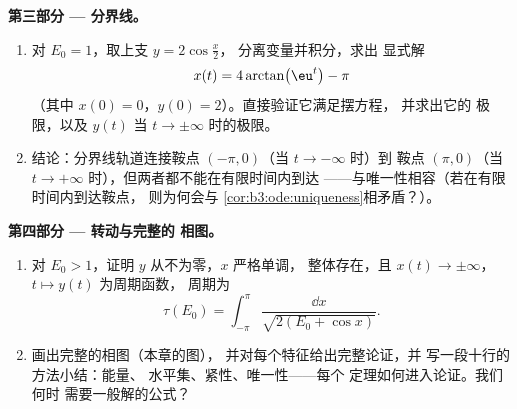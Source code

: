 \begin{problem}
\medskip
\noindent\textbf{第三部分 --- 分界线。}
\begin{enumerate}[resume]
  \item 对 $E_0 = 1$，取上支 $y = 2\cos\frac x2$，
        分离变量并积分，求出
        显式解
        \[
        x(t) = 4\arctan\bigl(\eu^{t}\bigr) - \pi
        \]
        （其中 $x(0) = 0$，$y(0) = 2$）。直接验证它满足摆方程，
        并求出它的
        极限，以及 $y(t)$ 当 $t \to
        \pm\infty$ 时的极限。
  \item 结论：分界线轨道连接鞍点
        $(-\pi, 0)$（当 $t \to -\infty$ 时）到
        鞍点 $(\pi, 0)$（当 $t \to +\infty$ 时），但两者都不能在有限时间内到达
        ——与唯一性相容（若在有限时间内到达鞍点，
        则为何会与
        \cref{cor:b3:ode:uniqueness}相矛盾？）。
\end{enumerate}

\medskip
\noindent\textbf{第四部分 --- 转动与完整的
相图。}
\begin{enumerate}[resume]
  \item 对 $E_0 > 1$，证明 $y$ 从不为零，$x$ 严格单调，
        整体存在，且 $x(t) \to
        \pm\infty$，$t \mapsto y(t)$ 为周期函数，
        周期为
        \[
        \tau(E_0) = \int_{-\pi}^{\pi}
        \frac{\dd x}{\sqrt{2(E_0 + \cos x)}} .
        \]
  \item 画出完整的相图（本章的图），
        并对每个特征给出完整论证，并
        写一段十行的方法小结：能量、
        水平集、紧性、唯一性——每个
        定理如何进入论证。我们何时
        需要一般解的公式？
\end{enumerate}


\end{problem}
